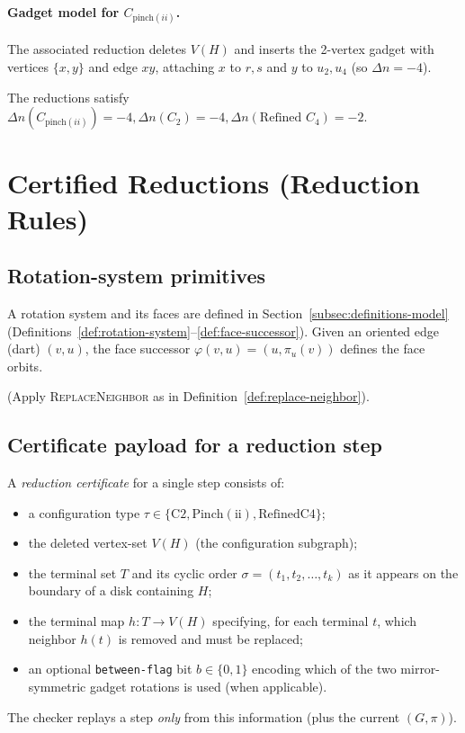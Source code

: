\documentclass[12pt]{article}
\theoremstyle{definition}
\newcommand{\PinchGadgetVertices}{2}
\newcommand{\CtwoDelta}{-4}
\newcommand{\RefinedCfourDelta}{-2}
\newcommand{\PinchIIGadgetDelta}{-4}
\begin{document}
\paragraph{Gadget model for $C_{\mathrm{pinch}(ii)}$.}
The associated reduction deletes $V(H)$ and inserts the \PinchGadgetVertices-vertex gadget with vertices $\{x,y\}$ and edge $xy$, attaching $x$ to $r,s$ and $y$ to $u_2,u_4$ (so $\Delta n = \PinchIIGadgetDelta$).

The reductions satisfy $\Delta n(C_{\mathrm{pinch}(ii)}) = \PinchIIGadgetDelta, \Delta n(C_2) = \CtwoDelta, \Delta n(\text{Refined } C_4) = \RefinedCfourDelta$.

\section{Certified Reductions (Reduction Rules)}
\label{sec:reductions}

\subsection{Rotation-system primitives}
\label{subsec:rot-primitives}

A rotation system and its faces are defined in Section~\ref{subsec:definitions-model} (Definitions~\ref{def:rotation-system}--\ref{def:face-successor}).
Given an oriented edge (dart) $(v,u)$, the face successor $\varphi(v,u) = (u, \pi_u(v))$ defines the face orbits.

\medskip

(Apply \textsc{ReplaceNeighbor} as in Definition~\ref{def:replace-neighbor}).


\subsection{Certificate payload for a reduction step}
\label{subsec:cert-payload}

A \emph{reduction certificate} for a single step consists of:
\begin{itemize}
  \item a configuration type $\tau\in\{\mathrm{C2},\mathrm{Pinch(ii)},\mathrm{RefinedC4}\}$;
  \item the deleted vertex-set $V(H)$ (the configuration subgraph);
  \item the terminal set $T$ and its cyclic order $\sigma=(t_1,t_2,\dots,t_k)$
        as it appears on the boundary of a disk containing $H$;
  \item the terminal map $h:T\to V(H)$ specifying, for each terminal $t$,
        which neighbor $h(t)$ is removed and must be replaced;
  \item an optional \texttt{between-flag} bit $b\in\{0,1\}$ encoding which of the
        two mirror-symmetric gadget rotations is used (when applicable).
\end{itemize}
The checker replays a step \emph{only} from this information (plus the current
$(G,\pi)$).
\end{document}
